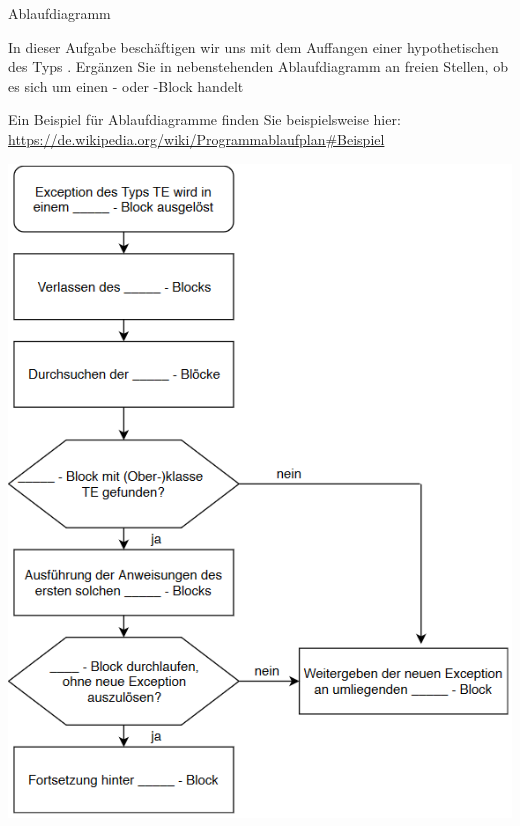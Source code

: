 \documentclass{../tuda-exercise}
\begin{document}
  \begin{task}[credit=\stars{1}{3}]{Ablaufdiagramm}
    \begin{minipage}[t]{.45\linewidth}
      \vspace{0pt}
      In dieser Aufgabe beschäftigen wir uns mit dem Auffangen einer hypothetischen
       des Typs . Ergänzen Sie in nebenstehenden
      Ablaufdiagramm an freien Stellen, ob es sich um einen - oder
      -Block handelt

      \br

      Ein Beispiel für Ablaufdiagramme finden Sie beispielsweise hier:
      \\
      \url{https://de.wikipedia.org/wiki/Programmablaufplan#Beispiel}
    \end{minipage}
    \hfill
    \begin{minipage}[t]{.45\linewidth}
      \vspace{0pt}
      \includegraphics[width=\linewidth]{graphics/V4_Task.png}
    \end{minipage}


\end{task}
\end{document}
